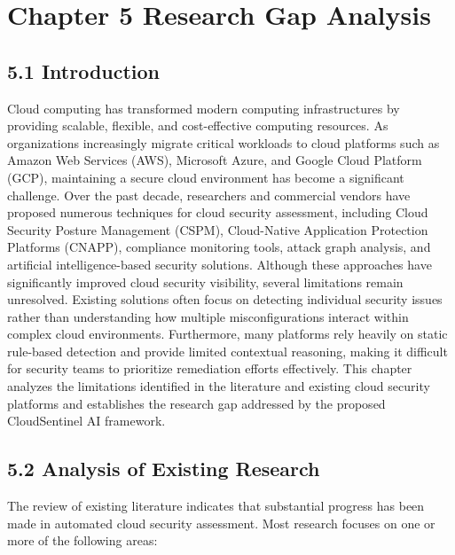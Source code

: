 \section{Chapter 5 Research Gap Analysis}

\subsection{5.1 Introduction}

Cloud computing has transformed modern computing infrastructures by providing scalable, flexible, and cost-effective computing resources. As organizations increasingly migrate critical workloads to cloud platforms such as Amazon Web Services (AWS), Microsoft Azure, and Google Cloud Platform (GCP), maintaining a secure cloud environment has become a significant challenge. Over the past decade, researchers and commercial vendors have proposed numerous techniques for cloud security assessment, including Cloud Security Posture Management (CSPM), Cloud-Native Application Protection Platforms (CNAPP), compliance monitoring tools, attack graph analysis, and artificial intelligence-based security solutions. Although these approaches have significantly improved cloud security visibility, several limitations remain unresolved. Existing solutions often focus on detecting individual security issues rather than understanding how multiple misconfigurations interact within complex cloud environments. Furthermore, many platforms rely heavily on static rule-based detection and provide limited contextual reasoning, making it difficult for security teams to prioritize remediation efforts effectively. This chapter analyzes the limitations identified in the literature and existing cloud security platforms and establishes the research gap addressed by the proposed CloudSentinel AI framework.

\subsection{5.2 Analysis of Existing Research}

The review of existing literature indicates that substantial progress has been made in automated cloud security assessment. Most research focuses on one or more of the following areas:

